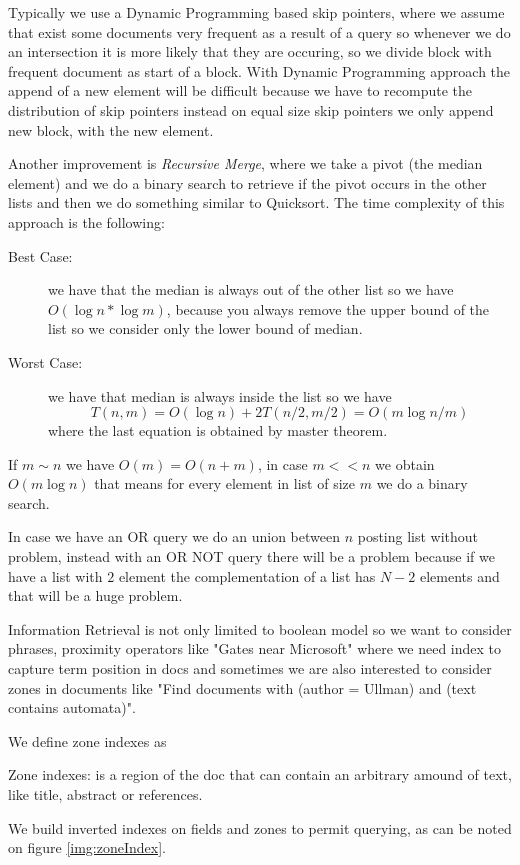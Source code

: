 Typically we use a Dynamic Programming based skip pointers, where we assume that exist some documents 
very frequent as a result of a query so whenever we do an intersection it is more likely that they are occuring,
so we divide block with frequent document as start of a block.\newline
With Dynamic Programming approach the append of a new element will be difficult because we have to recompute
the distribution of skip pointers instead on equal size skip pointers we only append new block, with the new element.

Another improvement is \emph{Recursive Merge}, where we take a pivot (the median element) and we do a 
binary search to retrieve if the pivot occurs in the other lists and then we do something similar to Quicksort.\newline
The time complexity of this approach is the following:
\begin{description}
    \item [Best Case: ] we have that the median is always out of the other list so we have $O(\log n * \log m)$, 
	                because you always remove the upper bound of the list so we consider only the lower bound of median.
    \item [Worst Case: ] we have that median is always inside the list so we have 
			 \[ T(n, m) = O(\log n) + 2T(n/2, m/2) = O(m \log n/m) \]
			 where the last equation is obtained by master theorem.
\end{description}
If $m \sim n$ we have $O(m) = O(n + m)$, in case $m << n$ we obtain $O(m \log n)$ that means for every element in list
of size $m$ we do a binary search.

In case we have an OR query we do an union between $n$ posting list without problem, instead with an OR NOT query
there will be a problem because if we have a list with $2$ element the complementation of a list has $N - 2$ 
elements and that will be a huge problem. 

Information Retrieval is not only limited to boolean model so we want to consider phrases, proximity operators
like "Gates near Microsoft" where we need index to capture term position in docs and sometimes we are also 
interested to consider zones in documents like "Find documents with (author = Ullman) and (text contains automata)".

We define zone indexes as
\begin{defi}
    Zone indexes: is a region of the doc that can contain an arbitrary amound of text, like title, abstract
                  or references.
\end{defi}
We build inverted indexes on fields and zones to permit querying, as can be noted on figure \ref{img:zoneIndex}.

